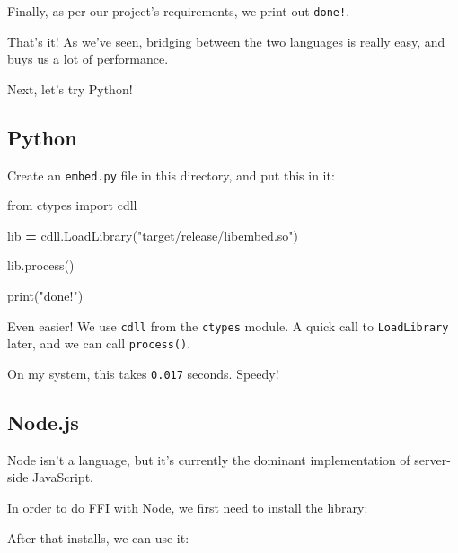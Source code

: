 \documentclass[a4paper,]{book}
\newenvironment{Shaded}{\begin{snugshade}}{\end{snugshade}}
\newcommand{\KeywordTok}[1]{\textcolor[rgb]{0.13,0.29,0.53}{\textbf{{#1}}}}
\newcommand{\StringTok}[1]{\textcolor[rgb]{0.31,0.60,0.02}{{#1}}}
\newcommand{\ImportTok}[1]{{#1}}
\newcommand{\OperatorTok}[1]{\textcolor[rgb]{0.81,0.36,0.00}{\textbf{{#1}}}}
\newcommand{\BuiltInTok}[1]{{#1}}
\newcommand{\NormalTok}[1]{{#1}}
\begin{document}
Finally, as per our project's requirements, we print out \texttt{done!}.

That's it! As we've seen, bridging between the two languages is really
easy, and buys us a lot of performance.

Next, let's try Python!

\subsection{Python}\label{python}

Create an \texttt{embed.py} file in this directory, and put this in it:

\begin{Shaded}
\begin{Highlighting}[]
\ImportTok{from} \NormalTok{ctypes }\ImportTok{import} \NormalTok{cdll}

\NormalTok{lib }\OperatorTok{=} \NormalTok{cdll.LoadLibrary(}\StringTok{"target/release/libembed.so"}\NormalTok{)}

\NormalTok{lib.process()}

\BuiltInTok{print}\NormalTok{(}\StringTok{"done!"}\NormalTok{)}
\end{Highlighting}
\end{Shaded}

Even easier! We use \texttt{cdll} from the \texttt{ctypes} module. A
quick call to \texttt{LoadLibrary} later, and we can call
\texttt{process()}.

On my system, this takes \texttt{0.017} seconds. Speedy!

\subsection{Node.js}\label{node.js}

Node isn't a language, but it's currently the dominant implementation of
server-side JavaScript.

In order to do FFI with Node, we first need to install the library:

\begin{Shaded}
\end{Shaded}

After that installs, we can use it:
\end{document}

